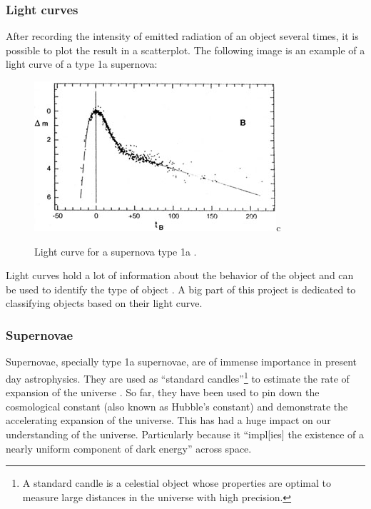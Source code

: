 \subsubsection{Light curves}

After recording the intensity of emitted radiation of an object several times, it is possible to plot the result in a scatterplot. The following image is an example of a light curve of a type 1a supernova:

\begin{figure}[H]
  \centering
  \includegraphics[width=0.8\textwidth]{snlightcurve.jpeg}c
  \caption{Light curve for a supernova type 1a \cite{snlightcurve}.}
\end{figure}

Light curves hold a lot of information about the behavior of the object and can be used to identify the type of object \cite{lc1,lc2}. A big part of this project is dedicated to classifying objects based on their light curve. 

\subsubsection{Supernovae}

Supernovae, specially type 1a supernovae, are of immense importance in present day astrophysics. They are used as ``standard candles''\footnote{A standard candle is a celestial object whose properties are optimal to measure large distances in the universe with high precision. } to estimate the rate of expansion of the universe \cite{expansion}. So far, they have been used to pin down the cosmological constant (also known as Hubble's constant) and demonstrate the accelerating expansion of the universe. This has had a huge impact on our understanding of the universe. Particularly because it ``impl[ies] the existence of a nearly uniform component of dark energy''\cite{darkEnergy} across space. \\


